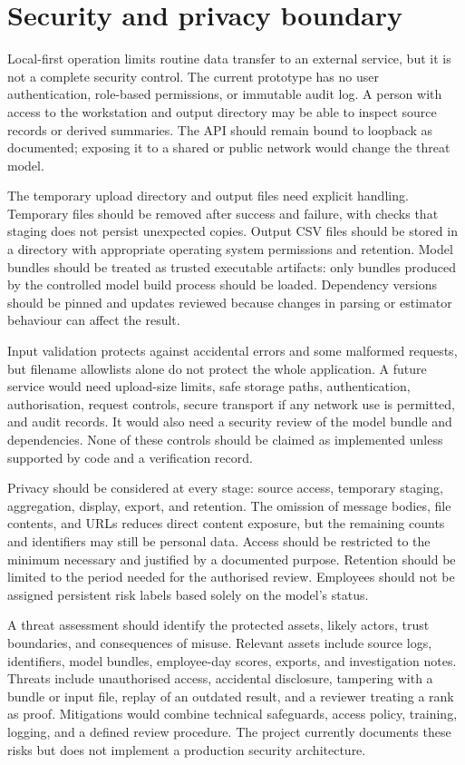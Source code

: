 \section{Security and privacy boundary}
Local-first operation limits routine data transfer to an external
service, but it is not a complete security control. The current
prototype has no user authentication, role-based permissions, or
immutable audit log. A person with access to the workstation and output
directory may be able to inspect source records or derived summaries.
The API should remain bound to loopback as documented; exposing it to a
shared or public network would change the threat model.

The temporary upload directory and output files need explicit
handling. Temporary files should be removed after success and failure,
with checks that staging does not persist unexpected copies. Output CSV
files should be stored in a directory with appropriate operating
system permissions and retention. Model bundles should be treated as
trusted executable artifacts: only bundles produced by the controlled
model build process should be loaded. Dependency versions should be
pinned and updates reviewed because changes in parsing or estimator
behaviour can affect the result.

Input validation protects against accidental errors and some malformed
requests, but filename allowlists alone do not protect the whole
application. A future service would need upload-size limits, safe
storage paths, authentication, authorisation, request controls, secure
transport if any network use is permitted, and audit records. It would
also need a security review of the model bundle and dependencies. None
of these controls should be claimed as implemented unless supported by
code and a verification record.

Privacy should be considered at every stage: source access, temporary
staging, aggregation, display, export, and retention. The omission of
message bodies, file contents, and URLs reduces direct content exposure,
but the remaining counts and identifiers may still be personal data.
Access should be restricted to the minimum necessary and justified by
a documented purpose. Retention should be limited to the period needed
for the authorised review. Employees should not be assigned persistent
risk labels based solely on the model's status.

A threat assessment should identify the protected assets, likely
actors, trust boundaries, and consequences of misuse. Relevant assets
include source logs, identifiers, model bundles, employee-day scores,
exports, and investigation notes. Threats include unauthorised access,
accidental disclosure, tampering with a bundle or input file, replay of
an outdated result, and a reviewer treating a rank as proof. Mitigations
would combine technical safeguards, access policy, training, logging,
and a defined review procedure. The project currently documents these
risks but does not implement a production security architecture.

